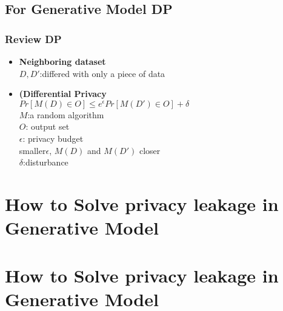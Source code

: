 \documentclass{beamer}
\begin{document}
\subsection{For Generative Model DP}
\begin{frame}
\frametitle{Review DP}
    \begin{itemize}
        \item \textbf{Neighboring dataset}\\[5pt]
        $D, D'$:differed with only a piece of data\\[20pt]
        \item \textbf{(Differential Privacy}\\[5pt]
        $Pr[M(D) \in O] \leq e^{\epsilon}Pr[M(D') \in O] + \delta$\\[5pt]
        $M$:a random algorithm\\
        $O$: output set\\
        $\epsilon$: privacy budget\\
        \quad smaller$\epsilon$, $M(D)$ and $M(D')$ closer\\
        $\delta$:disturbance\\
    \end{itemize}
\end{frame}
\section{How to Solve privacy leakage in Generative Model}


\section{How to Solve privacy leakage in Generative Model}
\end{document}
